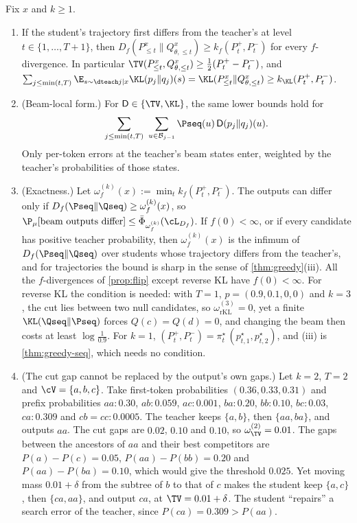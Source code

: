 \begin{theorem}\label{thm:beam}
\Pv\Ck Fix $x$ and $k\ge1$.
\begin{enumerate}[label=(\roman*),nosep]
\item If the student's trajectory first differs from the teacher's at level $t\in\{1,\dots,T+1\}$, then
$D_f(P^x_{\le t}\|Q^x_{\theta,\le t})\ge k_f(P^+_t,P^-_t)$ for every $f$-divergence. In particular
$\TV(P^x_{\le t},Q^x_{\theta,\le t})\ge\frac12(P^+_t-P^-_t)$, and
$\sum_{j\le\min(t,T)}\E_{s\sim\dteach j\mid x}\KL(p_j\|q_j)(s)=\KL(P^x_{\le t}\|Q^x_{\theta,\le t})\ge k_{\KL}(P^+_t,P^-_t)$.
\item (Beam-local form.) For $\mathsf D\in\{\TV,\KL\}$, the same lower bounds hold for
\[
\sum_{j\le\min(t,T)}\ \sum_{u\in\mathcal B_{j-1}}\Pseq(u)\,\mathsf D(p_j\|q_j)(u).
\]
Only per-token errors at the teacher's beam states enter, weighted by the teacher's probabilities of
those states.
\item (Exactness.) Let $\omega^{(k)}_f(x):=\min_tk_f(P^+_t,P^-_t)$. The outputs can differ only if
$D_f(\Pseq\|\Qseq)\ge\omega^{(k)}_f(x)$, so $\P_\mu[\text{beam outputs differ}]\le\bar\Phi_{\omega^{(k)}_f}(\cL_{D_f})$. If $f(0)<\infty$, or
if every candidate has positive teacher probability, then $\omega^{(k)}_f(x)$ is the infimum of $D_f(\Pseq\|\Qseq)$ over
students whose trajectory differs from the teacher's, and for trajectories the bound is sharp in the sense
of \cref{thm:greedy}(iii). All the $f$-divergences of \cref{prop:flip} except reverse KL have $f(0)<\infty$. For
reverse KL the condition is needed: with $T=1$, $p=(0.9,0.1,0,0)$ and $k=3$, the cut lies between two null
candidates, so $\omega^{(3)}_{\mathrm{rKL}}=0$, yet a finite $\KL(\Qseq\|\Pseq)$ forces $Q(c)=Q(d)=0$, and changing the beam then
costs at least $\log\frac1{0.9}$. For $k=1$, $(P^+_t,P^-_t)=\pi^\star_t\,(p^\star_{t,1},p^\star_{t,2})$, and (iii) is
\cref{thm:greedy-seq}, which needs no condition.
\item (The cut gap cannot be replaced by the output's own gaps.) Let $k=2$, $T=2$ and $\cV=\{a,b,c\}$. Take
first-token probabilities $(0.36,0.33,0.31)$ and prefix probabilities $aa:0.30$, $ab:0.059$, $ac:0.001$,
$ba:0.20$, $bb:0.10$, $bc:0.03$, $ca:0.309$ and $cb=cc:0.0005$. The teacher keeps $\{a,b\}$, then $\{aa,ba\}$, and outputs
$aa$. The cut gaps are $0.02$, $0.10$ and $0.10$, so $\omega^{(2)}_{\TV}=0.01$. The gaps between the ancestors of $aa$
and their best competitors are $P(a)-P(c)=0.05$, $P(aa)-P(bb)=0.20$ and $P(aa)-P(ba)=0.10$, which would give
the threshold $0.025$. Yet moving mass $0.01+\delta$ from the subtree of $b$ to that of $c$ makes the student keep
$\{a,c\}$, then $\{ca,aa\}$, and output $ca$, at $\TV=0.01+\delta$. The student ``repairs'' a search error of the
teacher, since $P(ca)=0.309>P(aa)$.
\end{enumerate}
\end{theorem}
